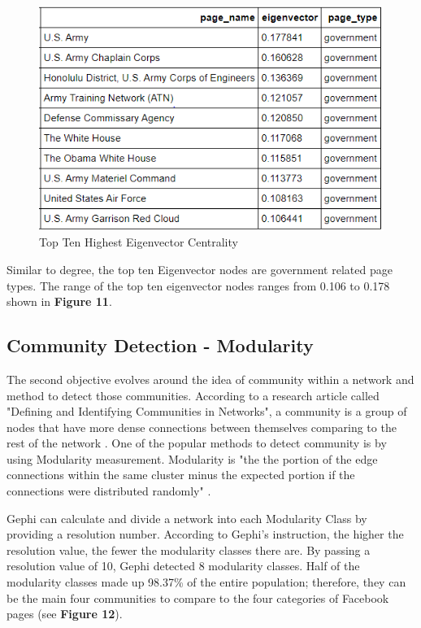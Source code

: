 \documentclass[11pt,twocolumn]{article}
\begin{document}
\begin{figure}[hbt!]
\includegraphics[scale=0.4]{top_ten_eigenvector.png} 
\caption{Top Ten Highest Eigenvector Centrality}
\end{figure}

Similar to degree, the top ten Eigenvector nodes are government related page types.  The range of the top ten eigenvector nodes ranges from 0.106 to 0.178 shown in \textbf{Figure 11}.

\subsection{Community Detection - Modularity}
The second objective evolves around the idea of community within a network and method to detect those communities. According to a research article called "Defining and Identifying Communities in Networks", a community is a group of nodes that have more dense connections  between themselves comparing to the rest of the network \cite{Radicchi2658}. One of the popular methods to detect community is by using Modularity measurement. Modularity is "the the portion of the edge connections within the same cluster minus the expected portion if the connections were distributed randomly" \cite{li_modular}.

Gephi can calculate and divide a network into each Modularity Class by providing a resolution number. According to Gephi's instruction, the higher the resolution value, the fewer the modularity classes there are. By passing a resolution value of 10, Gephi detected 8 modularity classes. Half of the modularity classes made up 98.37\% of the entire population; therefore, they can be the main four communities to compare to the four categories of Facebook pages (see \textbf{Figure 12}). 
\end{document}
